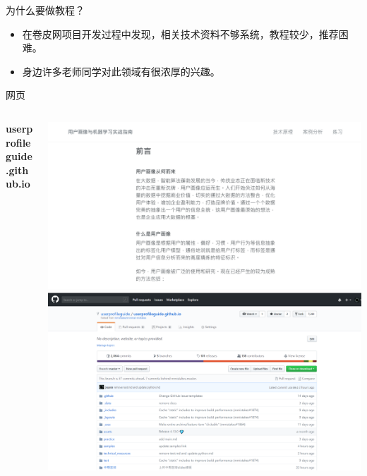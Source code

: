 \documentclass[10pt]{beamer}
\begin{document}
\begin{frame}{为什么要做教程？}
  \begin{itemize}
    \item 在卷皮网项目开发过程中发现，相关技术资料不够系统，教程较少，推荐困难。\newline
    \item 身边许多老师同学对此领域有很浓厚的兴趣。
  \end{itemize}
\end{frame}

\begin{frame}{网页}
\begin{columns}
  \begin{column}{0.4\textwidth}
    \textbf{userprofileguide.github.io}
  \end{column}
  \begin{column}{0.6\textwidth}
    \includegraphics[height=0.4\paperheight]{website1}
    \includegraphics[height=0.4\paperheight]{website2}
  \end{column}
  \end{columns}
\end{frame}
\end{document}
